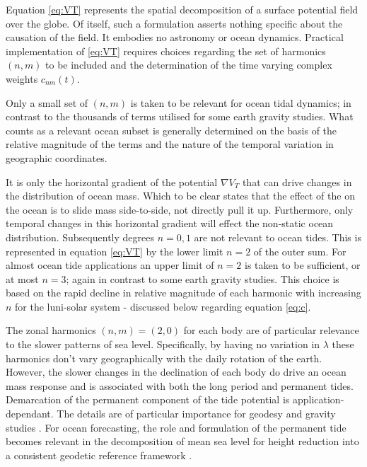 Equation \ref{eq:VT} represents the spatial decomposition of a surface potential field over the globe.  Of itself, such a formulation asserts nothing specific about the causation of the field.  It embodies no astronomy or ocean dynamics.
Practical implementation of \ref{eq:VT} requires choices regarding the set of harmonics $(n,m)$ to be included and the determination of the time varying complex weights $c_{nm}(t)$.


Only a small set of $(n,m)$ is taken to be relevant for ocean tidal dynamics; in contrast to the thousands of terms utilised for some earth gravity studies. What counts as a relevant ocean subset is generally determined on the basis of the relative magnitude of the terms and the nature of the temporal variation in geographic coordinates.

It is only the horizontal gradient of the potential $\nabla V_T$ that can drive changes in the distribution of ocean mass.   Which to be clear states that the effect of the \ATGP{} on the ocean is to slide mass side-to-side, not directly pull it up.   Furthermore, only temporal changes in this horizontal gradient will effect the non-static ocean distribution. Subsequently degrees $n=0,1$ are not relevant to ocean tides.   This is represented in equation \ref{eq:VT} by the lower limit $n=2$ of the outer sum.
For almost ocean tide applications an upper limit of $n=2$ is taken to be sufficient, or at most $n=3$; again in contrast to some earth gravity studies.  This choice is based on the rapid decline in relative magnitude of each harmonic with increasing $n$ for the luni-solar system - discussed below regarding equation \ref{eq:c}.



The zonal harmonics $(n,m) = (2,0)$ for each body are of particular relevance to the slower patterns of sea level.  Specifically, by having no variation in $\lambda$ these harmonics don't vary geographically with the daily rotation of the earth.   However, the slower changes in the declination of each body do drive an ocean mass response and is associated with both the long period and permanent tides.  
Demarcation of the permanent component of the tide potential is application-dependant.  The details are of particular importance for geodesy and gravity studies \citep[section 5.3.3.2]{Urban:2013vl}.  For ocean forecasting, the role and formulation of the permanent tide becomes relevant in the decomposition of mean sea level for height reduction into a consistent geodetic reference framework \citep{Filmer:2018cu,10.1007/bf02520477}.


